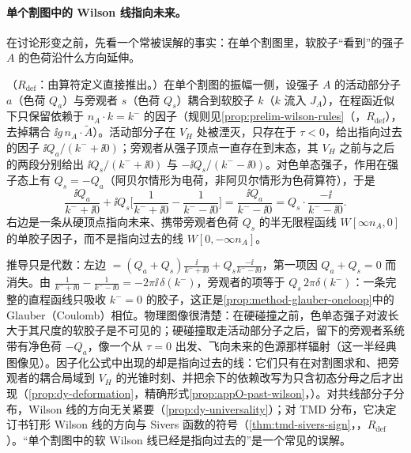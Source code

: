 \paragraph{单个割图中的 Wilson 线指向未来。}在讨论形变之前，先看一个常被误解的事实：在单个割图里，软胶子“看到”的强子 $A$ 的色荷沿什么方向延伸。

\begin{example}\label{ex:dy-future-vs-past}
（$R_{\mathrm{def}}$：由算符定义直接推出。）在单个割图的振幅一侧，设强子 $A$ 的活动部分子 $a$（色荷 $Q_a$）与旁观者 $s$（色荷 $Q_s$）耦合到软胶子 $k$（$k$ 流入 $J_A$），在程函近似下只保留依赖于 $n_A\cdot k=k^-$ 的因子（规则见\cref{prop:prelim-wilson-rules}（\tagR，$R_{\mathrm{def}}$），去掉耦合 $\ii g\,n_A\cdot\tilde A$）。活动部分子在 $V_H$ 处被湮灭，只存在于 $\tau<0$，给出指向过去的因子 $\ii Q_a/(k^-+\ii0)$；旁观者从强子顶点一直存在到末态，其 $V_H$ 之前与之后的两段分别给出 $\ii Q_s/(k^-+\ii0)$ 与 $-\ii Q_s/(k^--\ii0)$。对色单态强子，作用在强子态上有 $Q_s=-Q_a$（阿贝尔情形为电荷，非阿贝尔情形为色荷算符），于是
\begin{equation}\label{eq:dy-future}
\frac{\ii Q_a}{k^-+\ii0}+\ii Q_s\Big[\frac1{k^-+\ii0}-\frac1{k^--\ii0}\Big]=\frac{\ii Q_a}{k^--\ii0}=Q_s\cdot\frac{-\ii}{k^--\ii0}.
\end{equation}
右边是一条从硬顶点指向未来、携带旁观者色荷 $Q_s$ 的半无限程函线 $W[\infty n_A,0]$ 的单胶子因子，而不是指向过去的线 $W[0,-\infty n_A]$。
\end{example}

推导只是代数：左边 $=(Q_a+Q_s)\frac{\ii}{k^-+\ii0}+Q_s\frac{-\ii}{k^--\ii0}$，第一项因 $Q_a+Q_s=0$ 而消失。由 $\frac1{k^-+\ii0}-\frac1{k^--\ii0}=-2\pi\ii\,\delta(k^-)$，旁观者的项等于 $Q_s\,2\pi\delta(k^-)$：一条完整的直程函线只吸收 $k^-=0$ 的胶子，这正是\cref{prop:method-glauber-oneloop}中的 Glauber（Coulomb）相位。物理图像很清楚：在硬碰撞之前，色单态强子对波长大于其尺度的软胶子是不可见的；硬碰撞取走活动部分子之后，留下的旁观者系统带有净色荷 $-Q_a$，像一个从 $\tau=0$ 出发、飞向未来的色源那样辐射（这一半经典图像见\cite[第~9.3~节]{CollinsSoperSterman1989}）。因子化公式中出现的却是指向过去的线：它们只有在对割图求和、把旁观者的耦合局域到 $V_H$ 的光锥时刻、并把余下的依赖改写为只含初态分母之后才出现（\cref{prop:dy-deformation}，精确形式\cref{prop:appO-past-wilson}，\tagA）。对共线部分子分布，Wilson 线的方向无关紧要（\cref{prop:dy-universality}）；对 TMD 分布，它决定订书钉形 Wilson 线的方向与 Sivers 函数的符号（\cref{thm:tmd-sivers-sign}，\tagR，$R_{\mathrm{def}}$）。“单个割图中的软 Wilson 线已经是指向过去的”是一个常见的误解。

